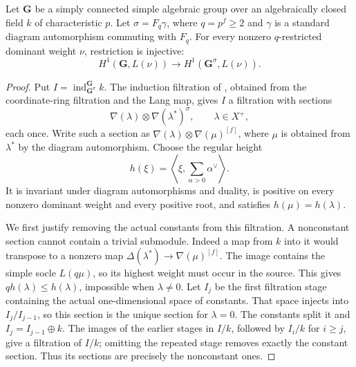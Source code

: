 \begin{lemma}\label{lift:h1-restriction}
Let $\mathbf G$ be a simply connected simple algebraic group over an
algebraically closed field $k$ of characteristic $p$.  Let
$\sigma=F_q\gamma$, where $q=p^f\geq2$ and $\gamma$ is a standard diagram
automorphism commuting with $F_q$.  For every nonzero $q$-restricted
dominant weight $\nu$, restriction is injective:
\[
 H^1(\mathbf G,L(\nu))\longrightarrow
 H^1(\mathbf G^\sigma,L(\nu)).
\]
\end{lemma}

\begin{proof}
Put $I=\operatorname{ind}_{\mathbf G^\sigma}^{\mathbf G}k$.
The induction filtration of
\cite[arXiv version, Proposition~3.1.2]{BNPPSS2015}, obtained from the
coordinate-ring filtration and the Lang map, gives $I$ a filtration with
sections
\[
 \nabla(\lambda)\otimes\nabla(\lambda^*)^\sigma,
 \qquad \lambda\in X^+,
\]
each once.  Write such a section as
$\nabla(\lambda)\otimes\nabla(\mu)^{[f]}$, where $\mu$ is obtained
from $\lambda^*$ by the diagram automorphism.  Choose the regular height
\[
 h(\xi)=\left\langle\xi,\sum_{\alpha>0}\alpha^\vee\right\rangle.
\]
It is invariant under diagram automorphisms and duality, is positive on
every nonzero dominant weight and every positive root, and satisfies
$h(\mu)=h(\lambda)$.

We first justify removing the actual constants from this filtration.
A nonconstant section cannot contain a trivial submodule.  Indeed a
map from $k$ into it would transpose to a nonzero map
$\Delta(\lambda^*)\to\nabla(\mu)^{[f]}$.  The image contains the
simple socle $L(q\mu)$, so its highest weight must occur in the
source.  This gives $qh(\lambda)\leq h(\lambda)$, impossible when
$\lambda\neq0$.  Let $I_j$ be the first filtration stage containing
the actual one-dimensional space of constants.  That space injects
into $I_j/I_{j-1}$, so this section is the unique section for
$\lambda=0$.  The constants split it and
$I_j=I_{j-1}\oplus k$.  The images of the earlier stages in $I/k$,
followed by $I_i/k$ for $i\geq j$, give a filtration of $I/k$;
omitting the repeated stage removes exactly the constant section.
Thus its sections are precisely the nonconstant ones.


\end{proof}

